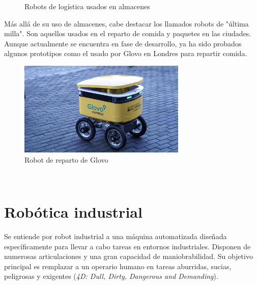 \begin{figure} [ht!]
    \centering    
    \hspace{1cm}
    \caption{Robots de logística usados en almacenes}
\end{figure}

Más allá de su uso de almacenes, cabe destacar los llamados robots de "última milla". Son aquellos usados en el reparto de comida y 
paquetes en las ciudades. Aunque actualmente se encuentra en fase de desarrollo, ya ha sido probados algunos 
prototipos como el usado por Glovo en Londres para repartir comida.
\begin{figure} [ht!]
    \begin{center}
      \includegraphics[width=8cm]{figs/reparto.jpg}
    \end{center}
    \caption{Robot de reparto de Glovo}
    \label{fig:glovo}
\end{figure}\ 

\newpage
\section{Robótica industrial}
\label{sec:rob_industrial}
Se entiende por robot industrial a una máquina automatizada diseñada específicamente para llevar a cabo tareas en entornos industriales. 
Disponen de numerosas articulaciones y una gran capacidad de maniobrabilidad. Su objetivo principal es remplazar a un 
operario humano en tareas aburridas, sucias, peligrosas y exigentes (\textit{4D: Dull, Dirty, Dangerous and Demanding}).



